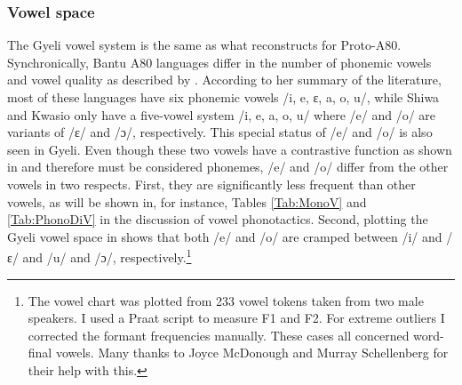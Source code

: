 
\subsubsection{Vowel space} 

The Gyeli vowel system is the same as what  \citet[389]{cheucle2014} reconstructs for Proto-A80. Synchronically, Bantu A80 languages differ in the number of phonemic vowels and vowel quality as described by \citet[324]{cheucle2014}. According to her summary of the literature, most of these languages have six phonemic vowels /i, e, ɛ, a, o, u/, while Shiwa and Kwasio only have a five-vowel system /i, e, a, o, u/ where /e/ and /o/ are variants of /ɛ/ and /ɔ/, respectively. This special status of /e/ and /o/ is also seen in Gyeli. Even though these two vowels have a contrastive function as shown in  and therefore must be considered phonemes, /e/ and /o/ differ from the other vowels in two respects. First, they are significantly less frequent than other vowels, as will be shown in, for instance, Tables \ref{Tab:MonoV} and \ref{Tab:PhonoDiV} in the discussion of vowel phonotactics. Second, plotting the Gyeli vowel space in  shows that both /e/ and /o/ are cramped between /i/ and /ɛ/ and /u/ and /ɔ/, respectively.\footnote{The vowel chart was plotted from 233 vowel tokens taken from two male speakers. I used a Praat script to measure F1 and F2. For extreme outliers I corrected the formant frequencies manually. These cases all concerned word-final vowels. Many thanks to Joyce McDonough and Murray Schellenberg for their help with this.}

